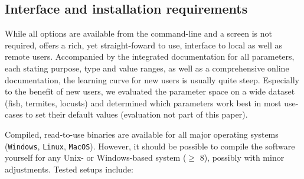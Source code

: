 \documentclass[9pt,lineno]{elife}
\newcommand{\TRex}{\protect\path{TRex}}
\renewcommand{\thefigure}{Figure~\arabic{figure}}
\renewcommand{\thetable}{Table~\arabic{table}}
\begin{document}

\appendix

\setcounter{table}{0}

\renewcommand{\thetable}{A\arabic{table}}
\renewcommand\thesection{\Alph{section}}
\renewcommand{\thefigure}{Appendix~\arabic{appendix} Figure~A\arabic{figure}}
\renewcommand{\thetable}{Appendix~\arabic{appendix} Table~A\arabic{table}}

\begin{appendixbox}
\section{Interface and installation requirements}

While all options are available from the command-line and a screen is not required, \TRex{} offers a rich, yet straight-foward to use, interface to local as well as remote users. Accompanied by the integrated documentation for all parameters, each stating purpose, type and value ranges, as well as a comprehensive online documentation, the learning curve for new users is usually quite steep. Especially to the benefit of new users, we evaluated the parameter space on a wide dataset (fish, termites, locusts) and determined which parameters work best in most use-cases to set their default values (evaluation not part of this paper).

Compiled, read-to-use binaries are available for all major operating systems (\texttt{Windows}, \texttt{Linux}, \texttt{MacOS}). However, it should be possible to compile the software yourself for any Unix- or Windows-based system ($\ge$ 8), possibly with minor adjustments. Tested setups include:


\end{appendixbox}
\end{document}
